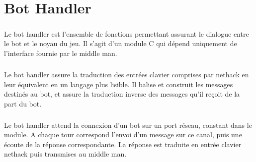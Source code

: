 \chapter{Bot Handler}

\paragraph{}
Le bot handler est l'ensemble de fonctions permettant assurant le dialogue
entre le bot et le noyau du jeu. Il s'agit d'un module C qui dépend uniquement de
l'interface fournie par le middle man.

\paragraph{}
Le bot handler assure la traduction des entrées clavier comprises par nethack en 
leur équivalent en un langage plus lisible. Il balise et construit les messages destinés
au bot, et assure la traduction inverse des messages qu'il reçoit de la part du bot.

\paragraph{}
Le bot handler attend la connexion d'un bot sur un port réseau, constant dans le module.
A chaque tour correspond l'envoi d'un message sur ce canal, puis une écoute de la réponse
correspondante. La réponse est traduite en entrée clavier nethack puis transmises au middle man.

